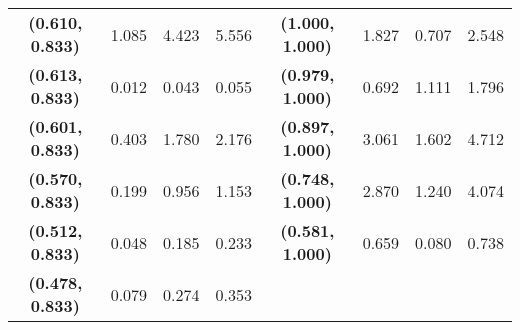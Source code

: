 \begin{table}[H]
{\begin{tabular}{@{}clllc|lll@{}}
\textbf{(0.610, 0.833)}   & 1.085                 & 4.423                   & 5.556                   & \textbf{(1.000, 1.000)}   & 1.827                 & 0.707                   & 2.548                   \\
\textbf{(0.613, 0.833)}   & 0.012                 & 0.043                   & 0.055                   & \textbf{(0.979, 1.000)}   & 0.692                 & 1.111                   & 1.796                   \\
\textbf{(0.601, 0.833)}   & 0.403                 & 1.780                   & 2.176                   & \textbf{(0.897, 1.000)}   & 3.061                 & 1.602                   & 4.712                   \\
\textbf{(0.570, 0.833)}   & 0.199                 & 0.956                   & 1.153                   & \textbf{(0.748, 1.000)}   & 2.870                 & 1.240                   & 4.074                   \\
\textbf{(0.512, 0.833)}   & 0.048                 & 0.185                   & 0.233                   & \textbf{(0.581, 1.000)}   & 0.659                 & 0.080                   & 0.738                   \\
\textbf{(0.478, 0.833)}   & 0.079                 & 0.274                   & 0.353                   & \textbf{}                 &                       &                         &                         \\ \bottomrule
\end{tabular}%
}
\end{table}
